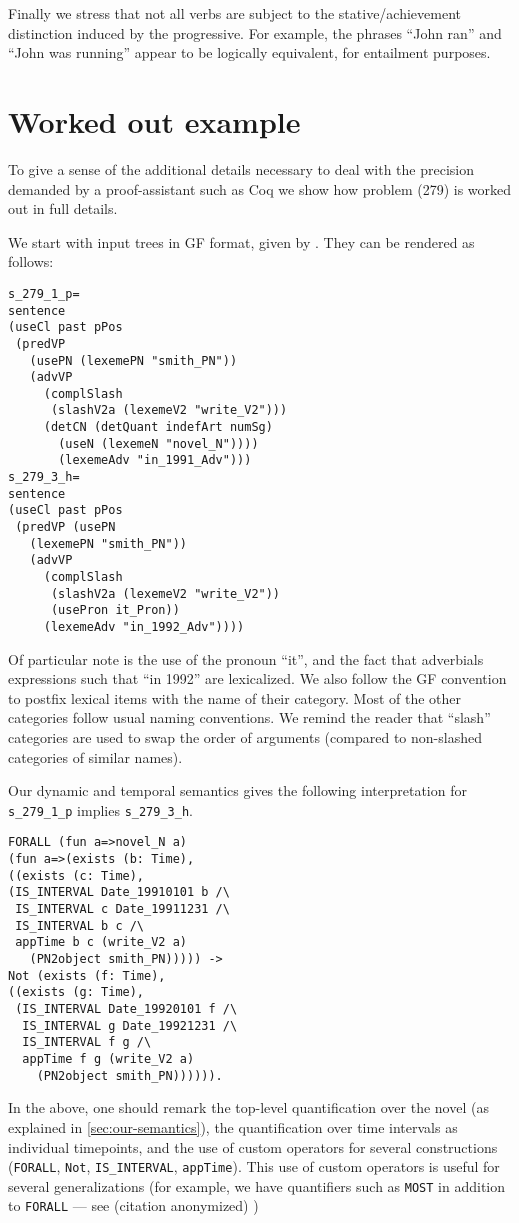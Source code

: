 \documentclass[a4paper,twoside]{article}
\begin{document}
Finally we stress that not all verbs are subject to the
stative/achievement distinction induced by the progressive. For
example, the phrases ``John ran'' and ``John was running'' appear to
be logically equivalent, for entailment purposes.


\section{Worked out example}
To give a sense of the additional details necessary to deal with the
precision demanded by a proof-assistant such as Coq we show how
problem (279) is worked out in full details.

We start with input trees in GF format, given by
\citet{Ljunglof:2012}. They can be rendered as follows:

\begin{small}
\begin{verbatim}
s_279_1_p=
sentence
(useCl past pPos
 (predVP
   (usePN (lexemePN "smith_PN"))
   (advVP
     (complSlash
      (slashV2a (lexemeV2 "write_V2")))
     (detCN (detQuant indefArt numSg)
       (useN (lexemeN "novel_N"))))
       (lexemeAdv "in_1991_Adv")))
s_279_3_h=
sentence
(useCl past pPos
 (predVP (usePN
   (lexemePN "smith_PN"))
   (advVP
     (complSlash
      (slashV2a (lexemeV2 "write_V2"))
      (usePron it_Pron))
     (lexemeAdv "in_1992_Adv"))))
\end{verbatim}
\end{small}

Of particular note is the use of the pronoun ``it'', and the fact that
adverbials expressions such that ``in 1992'' are lexicalized.  We also
follow the GF convention to postfix lexical items with the name of
their category. Most of the other categories follow usual naming
conventions. We remind the reader that ``slash'' categories are used
to swap the order of arguments (compared to non-slashed categories of
similar names).

Our dynamic and temporal semantics gives the following interpretation
for \verb!s_279_1_p! implies \verb!s_279_3_h!.
{\small
\begin{verbatim}
FORALL (fun a=>novel_N a)
(fun a=>(exists (b: Time),
((exists (c: Time),
(IS_INTERVAL Date_19910101 b /\
 IS_INTERVAL c Date_19911231 /\
 IS_INTERVAL b c /\
 appTime b c (write_V2 a)
   (PN2object smith_PN))))) ->
Not (exists (f: Time),
((exists (g: Time),
 (IS_INTERVAL Date_19920101 f /\
  IS_INTERVAL g Date_19921231 /\
  IS_INTERVAL f g /\
  appTime f g (write_V2 a) 
    (PN2object smith_PN)))))).
\end{verbatim}
}
In the above, one should remark the top-level quantification over the
novel (as explained in \cref{sec:our-semantics}), the quantification
over time intervals as individual timepoints, and the use of custom
operators for several constructions (\verb!FORALL!, \verb!Not!, \verb!IS_INTERVAL!,
\verb!appTime!). This use of custom operators is useful for several
generalizations (for example, we have quantifiers such as \verb!MOST! in
addition to \verb!FORALL! --- see \ifanon (citation anonymized)
\else \citet{bernardy_type-theoretical_2017} \fi)
\end{document}
